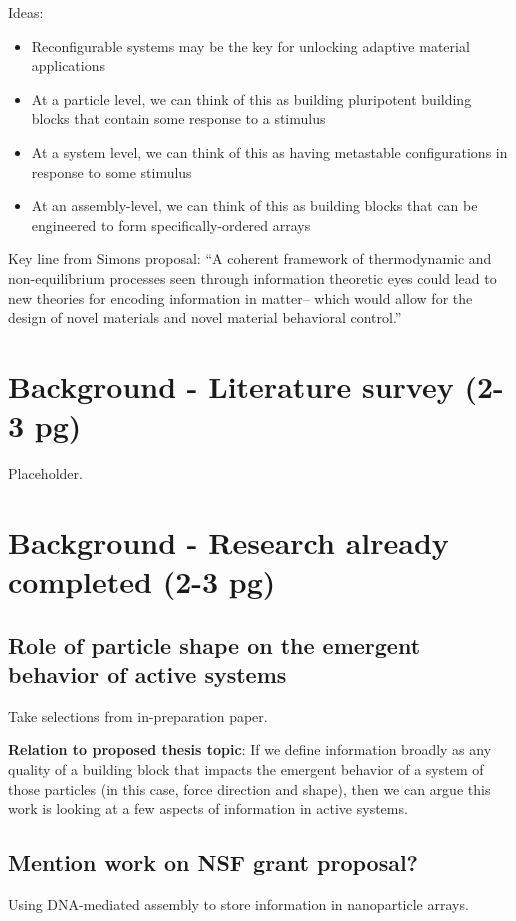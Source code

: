 \documentclass[11pt, oneside]{article}   	%
\begin{document}
Ideas:
\begin{itemize}
\item Reconfigurable systems may be the key for unlocking adaptive material applications
\item At a particle level, we can think of this as building pluripotent building blocks that contain some response to a stimulus
\item At a system level, we can think of this as having metastable configurations in response to some stimulus
\item At an assembly-level, we can think of this as building blocks that can be engineered to form specifically-ordered arrays
\end{itemize}


Key line from Simons proposal: ``A coherent framework of thermodynamic and non-equilibrium processes seen through information theoretic eyes could lead to new theories for encoding information in matter-- which would allow for the design of novel materials and novel material behavioral control.''

\section{Background - Literature survey (2-3 pg)}

Placeholder.

\section{Background - Research already completed (2-3 pg)}
\subsection{Role of particle shape on the emergent behavior of active systems}
Take selections from in-preparation paper.

\textbf{Relation to proposed thesis topic}: If we define information broadly as any quality of a building block that impacts the emergent behavior of a system of those particles (in this case, force direction and shape), then we can argue this work is looking at a few aspects of information in active systems.

\subsection{Mention work on NSF grant proposal?}
Using DNA-mediated assembly to store information in nanoparticle arrays. 
\end{document}
